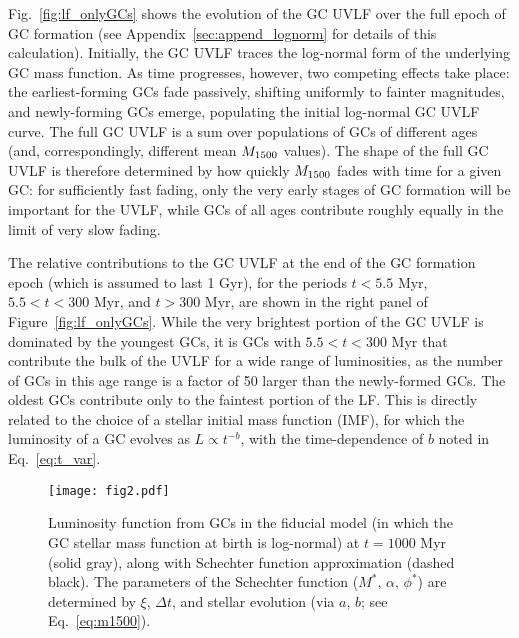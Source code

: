 \documentclass[fleqn,usenatbib]{mnras}
\begin{document}
Fig.~\ref{fig:lf_onlyGCs} shows the evolution of the GC UVLF over the full epoch
of GC formation (see Appendix~\ref{sec:append_lognorm} for details of this
calculation). Initially, the GC UVLF traces the log-normal form of the
underlying GC mass function. As time progresses, however, two competing effects
take place: the earliest-forming GCs fade passively, shifting uniformly to
fainter magnitudes, and newly-forming GCs emerge, populating the initial
log-normal GC UVLF curve. The full GC UVLF is a sum over populations of GCs of
different ages (and, correspondingly, different mean ${M_{\rm 1500}}$ values).  The shape
of the full GC UVLF is therefore determined by how quickly ${M_{\rm 1500}}$ fades with
time for a given GC: for sufficiently fast fading, only the very early stages of
GC formation will be important for the UVLF, while GCs of all ages contribute
roughly equally in the limit of very slow fading.

The relative contributions to the GC UVLF at the end of the GC formation epoch
(which is assumed to last 1 Gyr), for the periods $t < 5.5$ Myr, $5.5 < t < 300$
Myr, and $t > 300$ Myr, are shown in the right panel of
Figure~\ref{fig:lf_onlyGCs}. While the very brightest portion of the GC UVLF is
dominated by the youngest GCs, it is GCs with $5.5 < t < 300$ Myr that
contribute the bulk of the UVLF for a wide range of luminosities, as the number
of GCs in this age range is a factor of 50 larger than the newly-formed GCs. The
oldest GCs contribute only to the faintest portion of the LF. This is directly
related to the choice of a \citet{kroupa2001} stellar initial mass function
(IMF), for which the luminosity of a GC evolves as $L \propto t^{-b}$, with the
time-dependence of $b$ noted in Eq.~\eqref{eq:t_var}.



\begin{figure}
 \centering
 \texttt{[image: fig2.pdf]}
 \caption{Luminosity function from GCs in the fiducial model (in which the GC
   stellar mass function at birth is log-normal) at $t=1000$ Myr (solid gray),
   along with Schechter function approximation (dashed black).  The parameters
   of the Schechter function ($M^*, \,\alpha, \,\phi^*$) are determined by
   $\xi$, $\Delta t$, and stellar evolution (via $a,\,b$; see
   Eq.~\eqref{eq:m1500}).
 \label{fig:schechter}
}
\end{figure}
\end{document}
